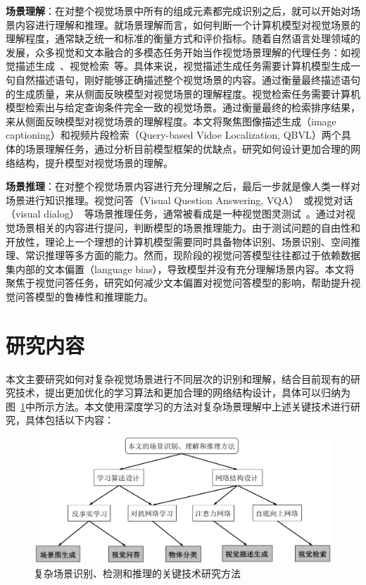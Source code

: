 \begin{asparaenum}
\item \textbf{场景理解}：在对整个视觉场景中所有的组成元素都完成识别之后，就可以开始对场景内容进行理解和推理。就场景理解而言，如何判断一个计算机模型对视觉场景的理解程度，通常缺乏统一和标准的衡量方式和评价指标。随着自然语言处理领域的发展，众多视觉和文本融合的多模态任务开始当作视觉场景理解的代理任务：如视觉描述生成~\cite{vinyals2015show}、视觉检索~\cite{gao2017tall}等。具体来说，视觉描述生成任务需要计算机模型生成一句自然描述语句，刚好能够正确描述整个视觉场景的内容。通过衡量最终描述语句的生成质量，来从侧面反映模型对视觉场景的理解程度。视觉检索任务需要计算机模型检索出与给定查询条件完全一致的视觉场景。通过衡量最终的检索排序结果，来从侧面反映模型对视觉场景的理解程度。本文将聚焦图像描述生成（image captioning）和视频片段检索（Query-based Vidoe Localization, QBVL）两个具体的场景理解任务，通过分析目前模型框架的优缺点，研究如何设计更加合理的网络结构，提升模型对视觉场景的理解。

\item \textbf{场景推理}：在对整个视觉场景内容进行充分理解之后，最后一步就是像人类一样对场景进行知识推理。视觉问答（Visual Question Answering, VQA）~\cite{antol2015vqa}或视觉对话（visual dialog）~\cite{das2017visual}等场景推理任务，通常被看成是一种视觉图灵测试~\cite{malinowski2014towards,geman2015visual}。通过对视觉场景相关的内容进行提问，判断模型的场景推理能力。由于测试问题的自由性和开放性，理论上一个理想的计算机模型需要同时具备物体识别、场景识别、空间推理、常识推理等多方面的能力。然而，现阶段的视觉问答模型往往都过于依赖数据集内部的文本偏置（language bias），导致模型并没有充分理解场景内容。本文将聚焦于视觉问答任务，研究如何减少文本偏置对视觉问答模型的影响，帮助提升视觉问答模型的鲁棒性和推理能力。
\end{asparaenum}


\section{研究内容}

本文主要研究如何对复杂视觉场景进行不同层次的识别和理解，结合目前现有的研究技术，提出更加优化的学习算法和更加合理的网络结构设计，具体可以归纳为图~\ref{ch1:fig:technique_summary}中所示方法。本文使用深度学习的方法对复杂场景理解中上述关键技术进行研究，具体包括以下内容：

\begin{figure}[t]
    \centering
        \includegraphics[width=0.95\linewidth]{chapter1/res/technique_summary.pdf}
    \centering
    \caption{复杂场景识别、检测和推理的关键技术研究方法}
    \label{ch1:fig:technique_summary}
\end{figure}

